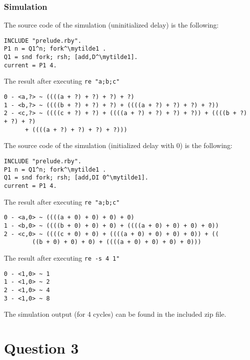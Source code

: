 \documentclass[a4paper,10pt]{article}
\newcommand{\mytilde}{$\sim$}
\begin{document}
\subsubsection*{Simulation}
The source code of the simulation (uninitialized delay) is the following:
\begin{Verbatim}[commandchars=\\\{\}]
INCLUDE "prelude.rby".
P1 n = Q1^n; fork^\mytilde1 .
Q1 = snd fork; rsh; [add,D^\mytilde1].
current = P1 4.
\end{Verbatim}
The result after executing \verb|re "a;b;c"|
\begin{Verbatim}[commandchars=\\\{\}]
0 - <a,?> ~ ((((a + ?) + ?) + ?) + ?)
1 - <b,?> ~ ((((b + ?) + ?) + ?) + ((((a + ?) + ?) + ?) + ?))
2 - <c,?> ~ ((((c + ?) + ?) + ((((a + ?) + ?) + ?) + ?)) + ((((b + ?) + ?) + ?) 
	  + ((((a + ?) + ?) + ?) + ?)))
\end{Verbatim}
The source code of the simulation (initialized delay with 0) is the following:
\begin{Verbatim}[commandchars=\\\{\}]
INCLUDE "prelude.rby".
P1 n = Q1^n; fork^\mytilde1 .
Q1 = snd fork; rsh; [add,DI 0^\mytilde1].
current = P1 4.
\end{Verbatim}
The result after executing \verb|re "a;b;c"|
\begin{Verbatim}[commandchars=\\\{\}]
0 - <a,0> ~ ((((a + 0) + 0) + 0) + 0)
1 - <b,0> ~ ((((b + 0) + 0) + 0) + ((((a + 0) + 0) + 0) + 0))
2 - <c,0> ~ ((((c + 0) + 0) + ((((a + 0) + 0) + 0) + 0)) + ((
	    ((b + 0) + 0) + 0) + ((((a + 0) + 0) + 0) + 0)))
\end{Verbatim}
The result after executing \verb|re -s 4 1"|
\begin{Verbatim}[commandchars=\\\{\}]
0 - <1,0> ~ 1
1 - <1,0> ~ 2
2 - <1,0> ~ 4
3 - <1,0> ~ 8
\end{Verbatim}
The simulation output (for 4 cycles) can be found in the included zip file.
\section*{Question 3}
\end{document}

